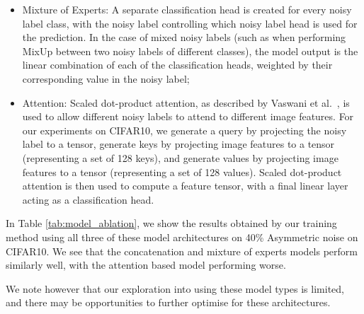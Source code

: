 \documentclass[10pt,twocolumn,letterpaper]{article}
\begin{document}
\begin{itemize}
    \item Mixture of Experts: A separate classification head is created for every noisy label class, with the noisy label controlling which noisy label head is used for the prediction. In the case of mixed noisy labels (such as when performing MixUp between two noisy labels of different classes), the model output is the linear combination of each of the classification heads, weighted by their corresponding value in the noisy label;
    \item Attention: Scaled dot-product attention, as described by Vaswani et al.~\cite{vaswani2017attention}, is used to allow different noisy labels to attend to different image features. For our experiments on CIFAR10, we generate a query by projecting the noisy label to a  tensor, generate keys by projecting image features to a  tensor (representing a set of 128 keys), and generate values by projecting image features to a  tensor (representing a set of 128 values). Scaled dot-product attention is then used to compute a  feature tensor, with a final linear layer acting as a classification head.
\end{itemize}

In Table \ref{tab:model_ablation}, we show the results obtained by our training method using all three of these model architectures on 40\% Asymmetric noise on CIFAR10. We see that the concatenation and mixture of experts models perform similarly well, with the attention based model performing  worse.

\begin{table}[ht!]
    \begin{center}
    \end{center}
    \caption{\small Accuracy using different model constructions for Asym. 40\% noise on CIFAR10} 
    \label{tab:model_ablation}
\end{table}

We note however that our exploration into using these model types is limited, and there may be opportunities to further optimise for these architectures.
\end{document}
